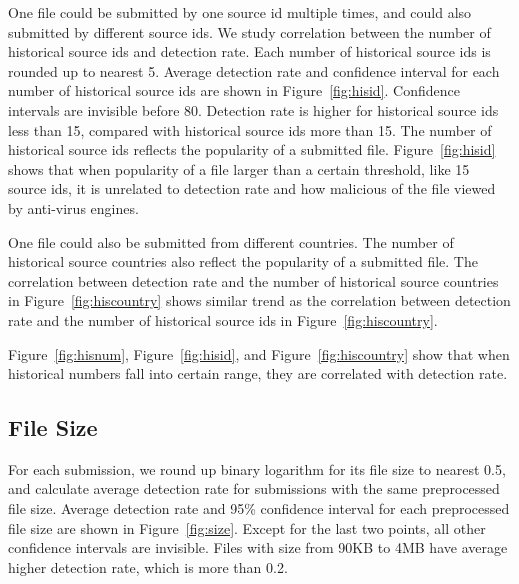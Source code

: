 One file could be submitted by one source id multiple times, 
and could also submitted by different source ids. 
We study correlation between the number of historical source ids and detection rate. 
Each number of historical source ids is rounded up to nearest 5. 
Average detection rate and confidence interval for each number of historical source ids are shown in Figure~\ref{fig:hisid}. 
Confidence intervals are invisible before 80. 
Detection rate is higher for historical source ids less than 15, compared with historical source ids more than 15.
The number of historical source ids reflects the popularity of a submitted file.
Figure~\ref{fig:hisid} shows that when popularity of a file larger than a certain threshold, like 15 source ids, 
it is unrelated to detection rate and how malicious of the file viewed by anti-virus engines. 


One file could also be submitted from different countries. 
The number of historical source countries also reflect the popularity of a submitted file. 
The correlation between detection rate and the number of historical source countries in 
Figure~\ref{fig:hiscountry} shows similar trend as the correlation between detection rate 
and the number of historical source ids in Figure~\ref{fig:hiscountry}. 

Figure~\ref{fig:hisnum}, Figure~\ref{fig:hisid}, and Figure~\ref{fig:hiscountry} show that 
when historical numbers fall into certain range, they are correlated with detection rate. 

\subsection{File Size}
\label{sec:size}

For each submission, we round up binary logarithm for its file size to nearest 0.5,
and calculate average detection rate for submissions with the same preprocessed file size.
Average detection rate and 95\% confidence interval for each preprocessed 
file size are shown in Figure~\ref{fig:size}.
Except for the last two points, all other confidence intervals are invisible.   
Files with size from 90KB to 4MB have average higher detection rate, which is more than 0.2. 


